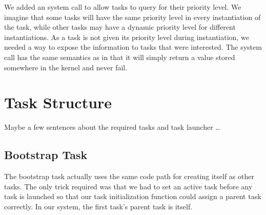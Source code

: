 \documentclass[pdftex,10pt,a4paper]{article}
\begin{document}
We added an  system call to allow tasks to query
for their priority level. We imagine that some tasks will have the
same priority level in every instantiation of the task, while other
tasks may have a dynamic priority level for different
instantiations. As a task is not given its priority level during
instantiation, we needed a way to expose the information to tasks that
were interested. The  system call has the same
semantics as  in that it will simply return a value
stored somewhere in the kernel and never fail.

\section*{Task Structure}

Maybe a few sentences about the required tasks and task launcher
\ldots

\subsection*{Bootstrap Task}

The bootstrap task actually uses the same code path for creating
itself as other tasks. The only trick required was that we had to set
an active task before any task is launched so that our task
initialization function could assign a parent task correctly. In our
system, the first task's parent task is itself.
\end{document}
